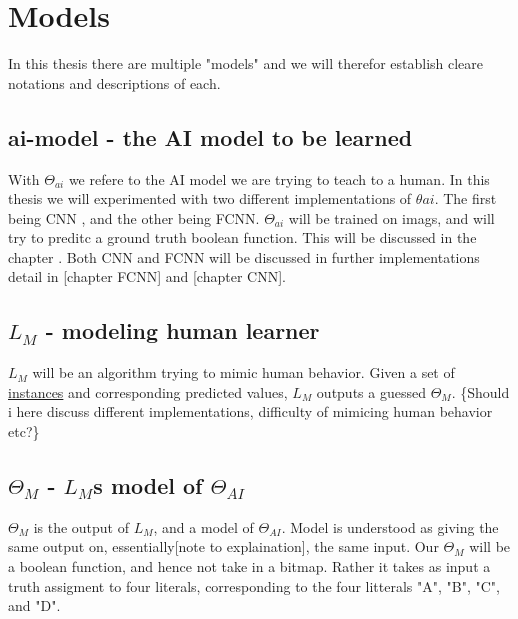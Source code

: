 \chapter{Models}

In this thesis there are multiple "models" and we will therefor establish cleare notations and descriptions of 
each.

\section{\gls{ai-model} - the AI model to be learned}

With $\Theta_{ai}$ we refere to the AI model we are trying to teach to a human. 
In this thesis we will experimented with two different implementations of $\theta{ai}$. 
The first being \gls{CNN} \cite{CNN:deeplearning}, and the other being \gls{FCNN}.
$\Theta_{ai}$ will be trained on imags, and will try to preditc a ground truth boolean function. 
This will be discussed in the chapter . Both \gls{CNN} and \gls{FCNN} will be discussed in further implementations detail in [chapter FCNN] and [chapter CNN].

\section{$L_M$ - modeling human learner}
$L_M$ will be an algorithm trying to mimic human behavior. Given a set of \hyperref[InstanceDescription]{instances} and corresponding predicted values, $L_M$ 
outputs a guessed $\Theta_{M}$. \{Should i here discuss different implementations, difficulty of mimicing human behavior etc?\}

\section{$\Theta_{M}$ - $L_M$s model of $\Theta_{AI}$}
$\Theta_{M}$ is the output of $L_M$, and a model of $\Theta_{AI}$. Model is understood as giving the same output on, essentially[note to explaination], the same input.
Our $\Theta_{M}$ will be a boolean function, and hence not take in a bitmap. Rather it takes as input a truth assigment to four literals, 
corresponding to the four litterals "A", "B", "C", and "D". 
